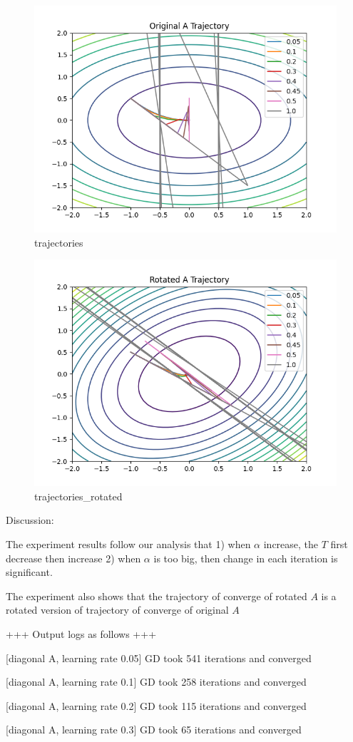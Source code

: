 \begin{answer}

\begin{figure}
    \centering
    \includegraphics[width=0.5\linewidth]{trajectories.png}
    \caption{trajectories}
    \label{fig:enter-label}
\end{figure}

\begin{figure}
    \centering
    \includegraphics[width=0.5\linewidth]{trajectories_rotated.png}
    \caption{trajectories\_rotated}
    \label{fig:enter-label}
\end{figure}

Discussion:

The experiment results follow our analysis that 1) when $\alpha$ increase, the $T$ first decrease then increase 2) when $\alpha$ is too big, then change in each iteration is significant.

The experiment also shows that the trajectory of converge of rotated $A$ is a rotated version of trajectory of converge of original $A$ 

+++  Output logs as follows +++

[diagonal A, learning rate 0.05] GD took 541 iterations and converged

[diagonal A, learning rate 0.1] GD took 258 iterations and converged

[diagonal A, learning rate 0.2] GD took 115 iterations and converged

[diagonal A, learning rate 0.3] GD took 65 iterations and converged


\end{answer}
